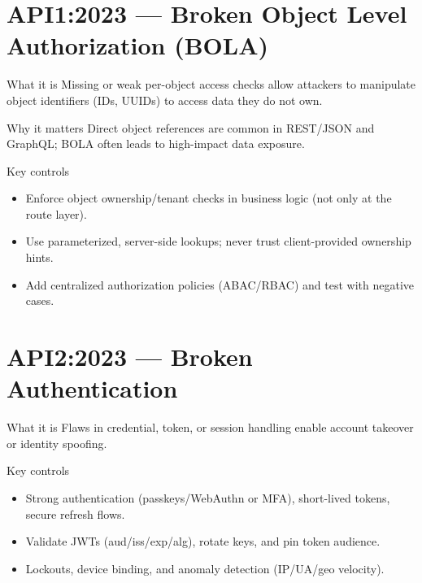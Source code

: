 \documentclass[11pt,a4paper]{article}
\begin{document}
\section{API1:2023 — Broken Object Level Authorization (BOLA)}
\begin{callout}{What it is}
Missing or weak per\mbox{-}object access checks allow attackers to manipulate object identifiers (IDs, UUIDs) to access data they do not own.
\end{callout}
\begin{callout}{Why it matters}
Direct object references are common in REST/JSON and GraphQL; BOLA often leads to high\mbox{-}impact data exposure.
\end{callout}
\begin{callout}{Key controls}
\begin{itemize}
  \item Enforce object ownership/tenant checks in business logic (not only at the route layer).
  \item Use parameterized, server\mbox{-}side lookups; never trust client\mbox{-}provided ownership hints.
  \item Add centralized authorization policies (ABAC/RBAC) and test with negative cases.
\end{itemize}
\end{callout}

\section{API2:2023 — Broken Authentication}
\begin{callout}{What it is}
Flaws in credential, token, or session handling enable account takeover or identity spoofing.
\end{callout}
\begin{callout}{Key controls}
\begin{itemize}
  \item Strong authentication (passkeys/WebAuthn or MFA), short\mbox{-}lived tokens, secure refresh flows.
  \item Validate JWTs (aud/iss/exp/alg), rotate keys, and pin token audience.
  \item Lockouts, device binding, and anomaly detection (IP/UA/geo velocity).
\end{itemize}
\end{callout}
\end{document}
